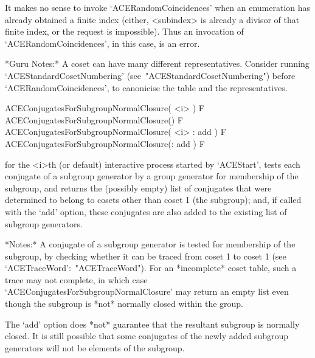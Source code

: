 It  makes  no  sense  to  invoke   `ACERandomCoincidences'   when   an
enumeration has already obtained a finite index (either, <subindex> is
already a divisor of that finite index, or the request is impossible).
Thus an invocation of `ACERandomCoincidences', in  this  case,  is  an
error.

*Guru  Notes:*  A  coset  can  have  many  different  representatives.
Consider              running              `ACEStandardCosetNumbering'
(see~"ACEStandardCosetNumbering") before  `ACERandomCoincidences',  to
canonicise the table and the representatives.

\>ACEConjugatesForSubgroupNormalClosure( <i> ) F
\>ACEConjugatesForSubgroupNormalClosure() F
\>ACEConjugatesForSubgroupNormalClosure( <i> : add ) F
\>ACEConjugatesForSubgroupNormalClosure(: add ) F

for the <i>th (or  default)  interactive  {\ACE}  process  started  by
`ACEStart', tests each conjugate of a subgroup generator  by  a  group
generator for membership of the subgroup, and  returns  the  (possibly
empty) list of conjugates that were determined  to  belong  to  cosets
other than coset 1 (the subgroup);  and,  if  called  with  the  `add'
option, these conjugates are  also  added  to  the  existing  list  of
subgroup generators.

*Notes:* A conjugate of a subgroup generator is tested for  membership
of the subgroup, by checking whether it can be traced from coset 1  to
coset 1  (see  `ACETraceWord':~"ACETraceWord").  For  an  *incomplete*
coset  table,  such  a  trace  may  not  complete,   in   which   case
`ACEConjugatesForSubgroupNormalClosure' may return an empty list  even
though the subgroup is *not* normally closed within the group.

The `add' option does *not* guarantee that the resultant  subgroup  is
normally closed. It is still possible  that  some  conjugates  of  the
newly added subgroup generators will not be elements of the subgroup.

\enditems

